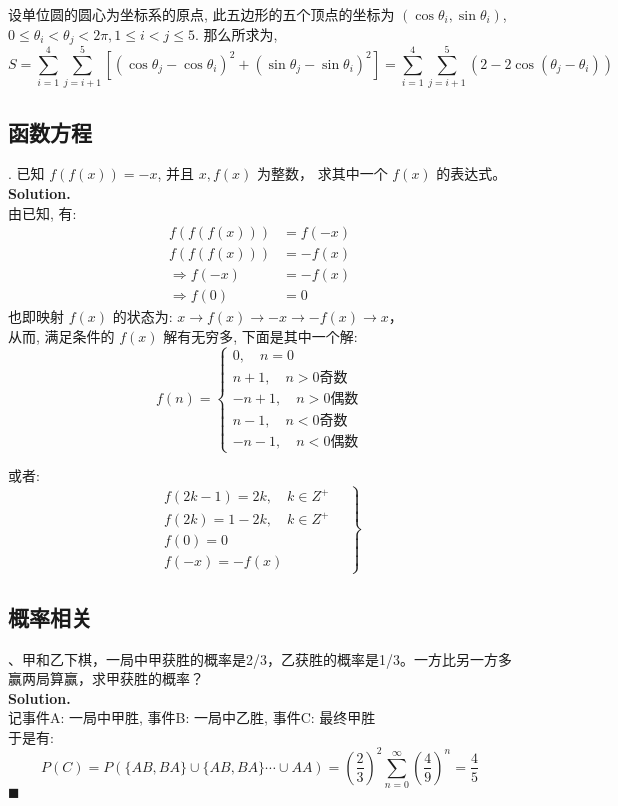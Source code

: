 \documentclass[UTF8]{article}
\begin{document}
\noindent 设单位圆的圆心为坐标系的原点, 此五边形的五个顶点的坐标为 $(\cos\theta_i,\sin\theta_i)$, $0\le \theta_i < \theta_j < 2\pi, 1 \le i < j \le 5$. 那么所求为,
 $$ S = \sum_{i=1}^{4}\sum_{j=i+1}^{5}[(\cos\theta_j-\cos\theta_i)^2+(\sin\theta_j-\sin\theta_i)^2] = \sum_{i=1}^{4}\sum_{j=i+1}^{5}(2-2\cos(\theta_j-\theta_i))$$

\subsection{函数方程}
. 已知 $f(f(x)) = -x$, 并且 $x, f(x) $ 为整数， 求其中一个 $f(x)$ 的表达式。 \\
\noindent \textbf{Solution.} \\
由已知, 有: 
\begin{align*}
f(f(f(x))) &= f(-x) \\
f(f(f(x))) &= -f(x) \\
\Longrightarrow  f(-x) & = -f(x) \\
\Longrightarrow f(0) & = 0
\end{align*}
也即映射 $f(x)$ 的状态为: $ x\rightarrow f(x)\rightarrow  -x\rightarrow -f(x)\rightarrow x$， \\
从而, 满足条件的 $f(x)$ 解有无穷多, 下面是其中一个解:
$$
f(n) = \left\{ 
\begin{aligned}
0,  \quad n=0 \\
n+1, \quad n>0\text{奇数}\\
-n+1,  \quad n>0\text{偶数}\\
n-1,  \quad n<0\text{奇数}\\
-n-1,  \quad n<0\text{偶数}
\end{aligned}
\right.
$$

或者: 
$$
\left. 
\begin{aligned}
f(2k-1) = 2k , \quad k \in Z^+ \\
f(2k) = 1-2k , \quad k \in Z^+ \\
f(0) = 0 \\
f(-x) = - f(x) 
\end{aligned}
\quad \right\}
$$

\subsection{概率相关}
、甲和乙下棋，一局中甲获胜的概率是2/3，乙获胜的概率是1/3。一方比另一方多赢两局算赢，求甲获胜的概率？ \\
\noindent \textbf{Solution.} \\
记事件A: 一局中甲胜, 事件B: 一局中乙胜, 事件C: 最终甲胜\\
于是有: 
$$P(C) =P(\{AB,BA\} \cup \{AB,BA\} \cdots \cup AA) = (\frac{2}{3})^2 \sum_{n=0}^{\infty}(\frac{4}{9})^n = \frac{4}{5}$$
$\blacksquare$
\end{document}
